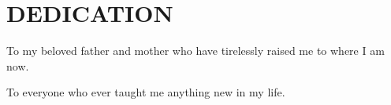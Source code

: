 \documentclass[../index.tex]{subfiles}
\begin{document}
\chapter*{DEDICATION}

\vspace*{\fill}

\begin{center}

   To my beloved father and mother who have tirelessly raised me to where I am now.

   To everyone who ever taught me anything new in my life.

\end{center}

\vspace*{\fill}
\end{document}

